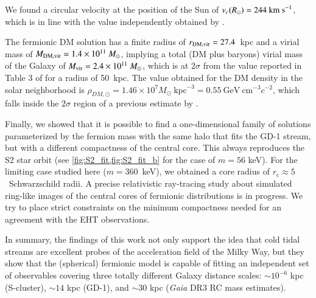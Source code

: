 \documentclass[referee]{aa} %
\begin{document}
We found a circular velocity at the position of the Sun of $v_c(R_\odot)= 244~\rm{km~s}^{-1}$, which is in line with the value independently obtained by \citet{2019MNRAS.486.2995M}.

The fermionic DM solution has a finite radius of $r_{\rm{DM,vir}}=27.4$~kpc and a virial mass of
$M_{\rm{DM,vir}}=1.4\times10^{11}~M_\odot$, implying a total (DM plus baryons) virial mass of the Galaxy of $M_{\rm{vir}}= 2.4\times10^{11}~M_\odot$, which is at $2\sigma$ from the value reported in Table 3 of
\citet{2014MNRAS.445.3788G} for a radius of 50~kpc. The value obtained for the DM density in the solar neighborhood is $\rho_{DM,\odot}=1.46\times10^7M_\odot~\mathrm{kpc}^{-3}=0.55~\mathrm{GeV}~\mathrm{cm}^{-3} c^{-2}$, which falls inside the $2\sigma$ region of a previous estimate by \citet{Salucci2010}.

Finally, we showed that it is possible to find a one-dimensional family of solutions parameterized by the fermion mass with the same halo that fits the GD-1 stream, but with a different compactness of the central core. This always reproduces the S2 star orbit (see \cref{fig:S2_fit,fig:S2_fit_b} for the case of $m=56$ keV). For the limiting case studied here ($m=360$~keV), we obtained a core radius of $r_\mathrm{c}\approx5$~Schwarzschild radii.
A precise relativistic ray-tracing study about simulated ring-like images of the central
cores of fermionic distributions is in progress. We try to place strict constraints on the minimum
compactness needed for an agreement with the EHT observations.

In summary, the findings of this work not only support the idea that cold tidal streams are excellent probes of the acceleration field of the Milky Way, but they show that the (spherical) fermionic model is capable of fitting an independent set of observables covering three totally different Galaxy distance scales: $\sim 10^{-6}$ kpc (S-cluster), $\sim 14$ kpc (GD-1), and $\sim 30$ kpc (\textit{Gaia} DR3 RC mass estimates).

\end{document}
